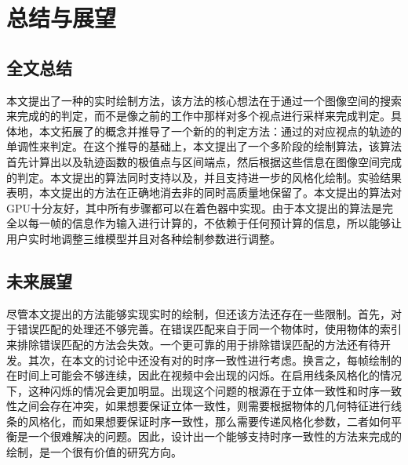 \chapter{总结与展望}

\section{全文总结}

本文提出了一种\stc{}\vdl{}的实时绘制方法，该方法的核心想法在于通过一个图像空间的搜索来完成\vdp{}的\epsl{}的判定，而不是像之前的工作中那样对多个视点进行采样来完成\epsl{}判定。具体地，本文拓展了\epsl{}的概念并推导了一个新的\epsl{}的判定方法：通过\vdp{}的对应视点的轨迹的单调性来判定\epsl{}。在这个推导的基础上，本文提出了一个多阶段的绘制算法，该算法首先计算出\vdl{}以及轨迹函数的极值点与区间端点，然后根据这些信息在图像空间完成\epsl{}的判定。本文提出的算法同时支持\con{}以及\scon{}，并且支持进一步的风格化绘制。实验结果表明，本文提出的方法在正确地消去非\stc{}\vdl{}的同时高质量地保留了\stc{}\epsl{}。本文提出的算法对GPU十分友好，其中所有步骤都可以在着色器中实现。由于本文提出的算法是完全以每一帧的信息作为输入进行计算的，不依赖于任何预计算的信息，所以能够让用户实时地调整三维模型并且对各种绘制参数进行调整。

\section{未来展望}

尽管本文提出的方法能够实现实时的\stc{}\vdl{}绘制，但还该方法还存在一些限制。首先，对于错误匹配的处理还不够完善。在错误匹配来自于同一个物体时，使用物体的索引来排除错误匹配的方法会失效。一个更可靠的用于排除错误匹配的方法还有待开发。其次，在本文的讨论中还没有对\vdl{}的时序一致性进行考虑。换言之，每帧绘制的\vdl{}在时间上可能会不够连续，因此在视频中会出现\vdl{}的闪烁。在启用线条风格化的情况下，这种闪烁的情况会更加明显。出现这个问题的根源在于立体一致性和时序一致性之间会存在冲突，如果想要保证立体一致性，则需要根据物体的几何特征进行线条的风格化，而如果想要保证时序一致性，那么需要传递风格化参数，二者如何平衡是一个很难解决的问题。因此，设计出一个能够支持时序一致性的方法来完成\stc{}\vdl{}的绘制，是一个很有价值的研究方向。